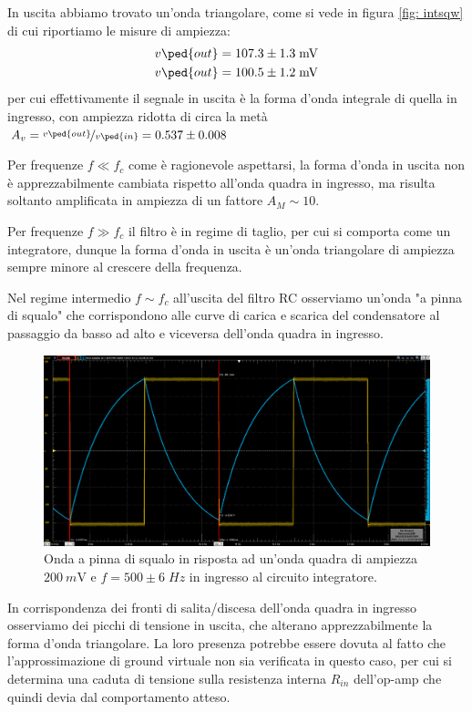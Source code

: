 \documentclass[10pt,a4paper]{article}
\begin{document}
In uscita abbiamo trovato un'onda triangolare, come si vede in figura
\ref{fig: intsqw} di cui riportiamo le misure di ampiezza:
\begin{align*}
v\ped{out} = 107.3 \pm 1.3 \; \si{m\V} \\
v\ped{out} = 100.5 \pm 1.2 \; \si{m\V}
\end{align*}
per cui effettivamente il segnale in uscita è la forma d'onda integrale
di quella in ingresso, con ampiezza ridotta di circa la metà
$A_v = \nicefrac{v\ped{out}}{v\ped{in}} = 0.537 \pm 0.008$

Per frequenze $f \ll f_c$ come è ragionevole aspettarsi, la forma d'onda in
uscita non è apprezzabilmente cambiata rispetto all'onda quadra in ingresso,
ma risulta soltanto amplificata in ampiezza di un fattore $A_M \sim 10$.

Per frequenze $f \gg f_c$ il filtro è in regime di taglio, per cui si comporta
come un integratore, dunque la forma d'onda in uscita è un'onda triangolare di
ampiezza sempre minore al crescere della frequenza.

Nel regime intermedio $f \sim f_c$ all'uscita del filtro RC osserviamo un'onda
"a pinna di squalo" che corrispondono alle curve di carica e scarica del
condensatore al passaggio da basso ad alto e viceversa dell'onda quadra in
ingresso.
\begin{figure}[htbp]
\centering
\includegraphics[scale=0.335]{intfin}
\caption{Onda a pinna di squalo in risposta ad un'onda quadra di ampiezza
$\SI{200}{m\V}$ e $f = 500 \pm 6 \; \si{Hz}$ in ingresso al circuito
integratore. \label{fig: intfin}}
\end{figure}

In corrispondenza dei fronti di salita/discesa dell'onda quadra in ingresso
osserviamo dei picchi di tensione in uscita, che alterano apprezzabilmente
la forma d'onda triangolare. La loro presenza potrebbe essere dovuta al fatto
che l'approssimazione di ground virtuale non sia verificata in questo caso,
per cui si determina una caduta di tensione sulla resistenza interna $R_{in}$
dell'op-amp che quindi devia dal comportamento atteso.
\end{document}
